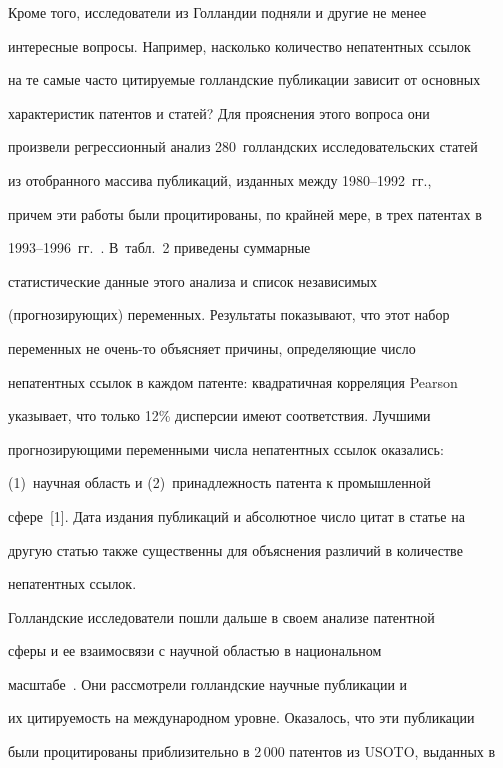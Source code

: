      Кроме того, исследователи из Голландии подняли и другие не менее 


интересные вопросы. Например, насколько количество непатентных ссылок 


на те самые часто цитируемые голландские публикации зависит от основных 


характеристик патентов и статей? Для прояснения этого вопроса они 


произвели регрессионный анализ 280~голландских исследовательских статей 


из отобранного массива публикаций, изданных между 1980--1992~гг., 


причем эти работы были процитированы, по крайней мере, в трех патентах в 


1993--1996~гг.~\cite{1-koz}. В~табл.~2 приведены суммарные 


статистические данные этого анализа и список независимых 


(прогнозирующих) переменных. Результаты показывают, что этот набор 


переменных не очень-то объясняет причины, определяющие число 


непатентных ссылок в каждом патенте: квадратичная корреляция Pearson 


указывает, что только 12\% дисперсии имеют соответствия. Лучшими 


прогнозирующими переменными числа непатентных ссылок оказались: 


(1)~научная область и (2)~принадлежность патента к промышленной 


сфере~[1]. Дата издания публикаций и абсолютное число цитат в статье на 


другую статью также существенны для объяснения различий в количестве 


непатентных ссылок.


      





     


     Голландские исследователи пошли дальше в своем анализе патентной 


сферы и ее взаимосвязи с научной областью в национальном 


масштабе~\cite{1-koz}. Они рас\-смот\-ре\-ли голландские научные публикации и 


их цитируемость на международном уровне. Оказалось, что эти публикации 


были процитированы приблизительно в 2\,000 патентов из USOTO, выданных в 


